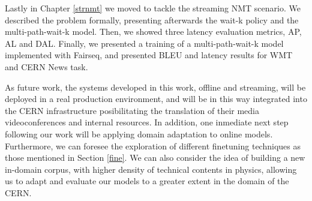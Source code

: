 \documentclass[11pt,english,listoffigures,listoftables]{tfgetsinf}
\begin{document}
Lastly in Chapter \ref{strnmt} we moved to tackle the streaming NMT scenario. We described the problem formally, presenting afterwards the wait-k policy and the multi-path-wait-k model. Then, we showed three latency evaluation metrics, AP, AL and DAL. Finally, we presented a training of a multi-path-wait-k model implemented with Fairseq, and presented BLEU and latency results for WMT and CERN News task. 

As future work, the systems developed in this work, offline and streaming, will be deployed in a real production environment, and will be in this way integrated into the CERN infrastructure posibilitating the translation of their media videoconferences and internal resources. In addition, one inmediate next step following our work will be applying domain adaptation to online models. Furthermore, we can foresee the exploration of different finetuning techniques as those mentioned in Section \ref{fine}. We can also consider the idea of building a new in-domain corpus, with higher density of technical contents in physics, allowing us to adapt and evaluate our models to a greater extent in the domain of the CERN. 



\cleardoublepage





%
%
%
%
%
%
%


\end{document}
